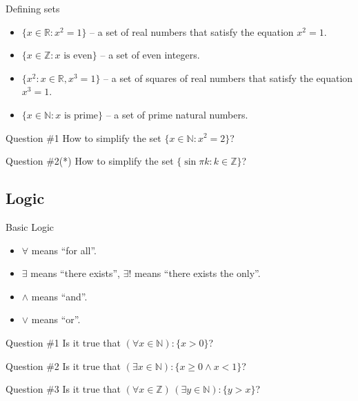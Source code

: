 \documentclass{beamer}
\begin{document}
    \begin{frame}{Defining sets}
      \begin{example}
        \begin{itemize}
          \item $\{x \in \mathbb{R}: x^2 = 1\}$ -- a set of real numbers that satisfy the equation $x^2 = 1$.
          \item $\{x \in \mathbb{Z}: x \text{ is even}\}$ -- a set of even integers.
          \item $\{x^2: x \in \mathbb{R}, x^3 = 1\}$ -- a set of squares of real numbers that satisfy the equation $x^3 = 1$.
          \item $\{x \in \mathbb{N}: x \text{ is prime}\}$ -- a set of prime natural numbers.
        \end{itemize}
      \end{example}

      \begin{alertblock}{Question \#1}
        How to simplify the set $\{x \in \mathbb{N}: x^2 = 2\}$?
      \end{alertblock}
  
      \begin{alertblock}{Question \#2(*)}
        How to simplify the set $\{\sin \pi k: k \in \mathbb{Z}\}$?
      \end{alertblock}
    \end{frame}

    \subsection{Logic}
    \begin{frame}{Basic Logic}
        \begin{itemize}
          \item $\forall$ means ``for all''.
          \item $\exists$ means ``there exists'', $\exists!$ means ``there exists the only''.
          \item $\land$ means ``and''.
          \item $\lor$ means ``or''.
        \end{itemize}

        \begin{alertblock}{Question \#1}
            Is it true that $(\forall x \in \mathbb{N}): \{x > 0\}$?
        \end{alertblock}

        \begin{alertblock}{Question \#2}
            Is it true that $(\exists x \in \mathbb{N}): \{x \geq 0 \land x < 1\}$?
        \end{alertblock}

        \begin{alertblock}{Question \#3}
            Is it true that $(\forall x \in \mathbb{Z})\, (\exists y \in \mathbb{N}): \{y > x\}$?
        \end{alertblock}
    \end{frame}
\end{document}
